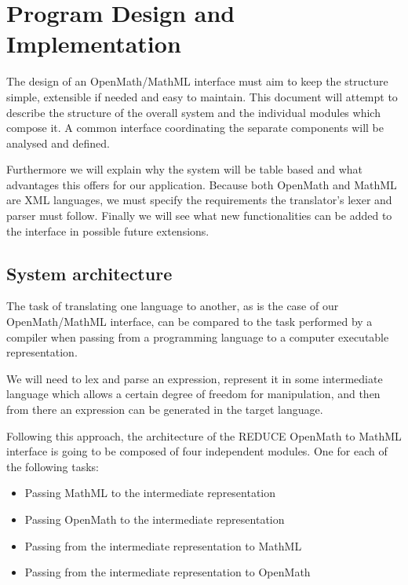 \chapter{Program Design and Implementation}

The design of an OpenMath/MathML interface must aim to keep the structure simple, extensible if needed and easy to maintain. This document will
attempt to describe the structure of the overall system and the individual modules which compose it. A common interface coordinating the separate
components will be analysed and defined.

Furthermore we will explain why the system will be table based and what advantages this offers for our application. Because both OpenMath and
MathML are XML languages, we must specify the requirements the translator's lexer and parser must follow. Finally we will see what new
functionalities can be added to the interface in possible future extensions.

\section{System architecture}

The task of translating one language to another, as is the case of our OpenMath/MathML interface, can be compared to the task performed by a
compiler when passing from a programming language to a computer executable representation.

We will need to lex and parse an expression, represent it in some intermediate language which allows a certain degree of freedom for manipulation,
and then from there an expression can be generated in the target language.

Following this approach, the architecture of the REDUCE OpenMath to MathML interface is going to be composed of four independent modules. One for
each of the following tasks:

\begin{itemize}

\item Passing MathML to the intermediate representation

\item Passing OpenMath to the intermediate representation

\item Passing from the intermediate representation to MathML

\item Passing from the intermediate representation to OpenMath

\end{itemize}


